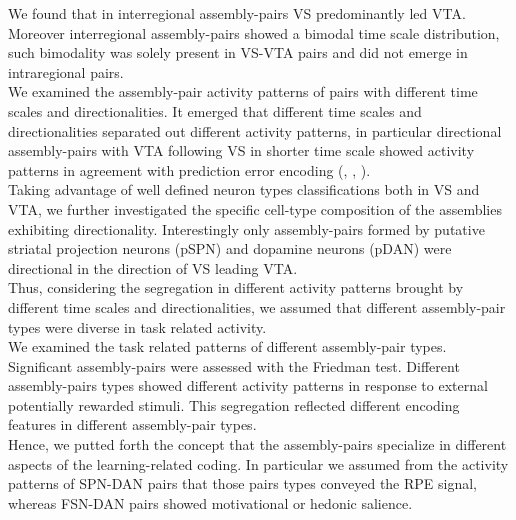 We found that in interregional assembly-pairs VS predominantly led VTA. Moreover interregional assembly-pairs showed a bimodal time scale distribution, such bimodality was solely present in VS-VTA pairs and did not emerge in intraregional pairs.\\We examined the assembly-pair activity patterns of pairs with different time scales and directionalities. It emerged that different time scales and directionalities separated out different activity patterns, in particular directional assembly-pairs with VTA following VS in shorter time scale showed activity patterns in agreement with prediction error encoding (\cite{Tobler2003}, \cite{Nomoto2010}, \cite{Schultz2016}).\\Taking advantage of well defined neuron types classifications both in VS and VTA, we further investigated the specific cell-type composition of the assemblies exhibiting directionality. Interestingly only assembly-pairs formed by putative striatal projection neurons (pSPN) and dopamine neurons (pDAN) were directional in the direction of VS leading VTA.\\Thus, considering the segregation in different activity patterns brought by different time scales and directionalities, we assumed that different assembly-pair types were diverse in task related activity.\\We examined the task related patterns of different assembly-pair types. Significant assembly-pairs were assessed with the Friedman test. Different assembly-pairs types showed different activity patterns in response to external potentially rewarded stimuli. This segregation reflected different encoding features in different assembly-pair types.\\Hence, we putted forth the concept that the assembly-pairs specialize in different aspects of the learning-related coding. In particular we assumed from the activity patterns of SPN-DAN pairs that those pairs types conveyed the RPE signal, whereas FSN-DAN pairs showed motivational or hedonic salience.\\%
